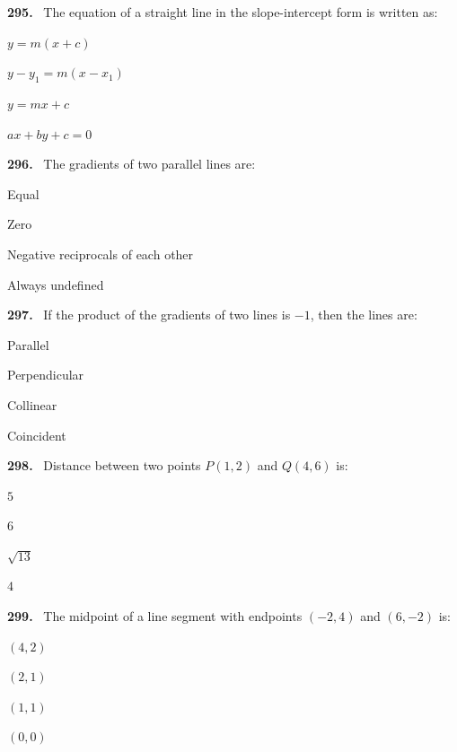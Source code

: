 \documentclass[11pt]{article}
\newenvironment{qenv}[1]{%
  \par\medskip\noindent\textbf{#1.}\ \ignorespaces
}{\par}
\begin{document}
\begin{qenv}{295} The equation of a straight line in the slope-intercept form is written as:
\begin{options} \item $y=m(x+c)$ \item $y-y_1=m(x-x_1)$ \item $y=mx+c$ \item $ax+by+c=0$ \end{options} \end{qenv}

\begin{qenv}{296} The gradients of two parallel lines are:
\begin{options} \item Equal \item Zero \item Negative reciprocals of each other \item Always undefined \end{options} \end{qenv}

\begin{qenv}{297} If the product of the gradients of two lines is $-1$, then the lines are:
\begin{options} \item Parallel \item Perpendicular \item Collinear \item Coincident \end{options} \end{qenv}

\begin{qenv}{298} Distance between two points $P(1,2)$ and $Q(4,6)$ is:
\begin{options} \item $5$ \item $6$ \item $\sqrt{13}$ \item $4$ \end{options} \end{qenv}

\begin{qenv}{299} The midpoint of a line segment with endpoints $(-2,4)$ and $(6,-2)$ is:
\begin{options} \item $(4,2)$ \item $(2,1)$ \item $(1,1)$ \item $(0,0)$ \end{options} \end{qenv}
\end{document}
